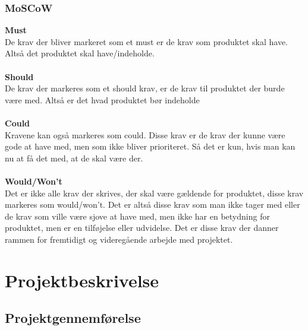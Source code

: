 \subsection{MoSCoW}
\textbf{Must}\\
De krav der bliver markeret som et must er de krav som produktet skal have. Altså det produktet skal have/indeholde.\\\\
\textbf{Should}\\
De krav der markeres som et should krav, er de krav til produktet der burde være med. Altså er det hvad produktet bør indeholde\\\\
\textbf{Could}\\
Kravene kan også markeres som could. Disse krav er de krav der kunne være gode at have med, men som ikke bliver prioriteret. Så det er kun, hvis man kan nu at få det med, at de skal være der.\\\\
\textbf{Would/Won't}\\
Det er ikke alle krav der skrives, der skal være gældende for produktet, disse krav markeres som would/won't. Det er altså disse krav som man ikke tager med eller de krav som ville være sjove at have med, men ikke har en betydning for produktet, men er en tilføjelse eller udvidelse. Det er disse krav der danner rammen for fremtidigt og videregående arbejde med projektet.
\chapter{Projektbeskrivelse}
\section{Projektgennemførelse}
